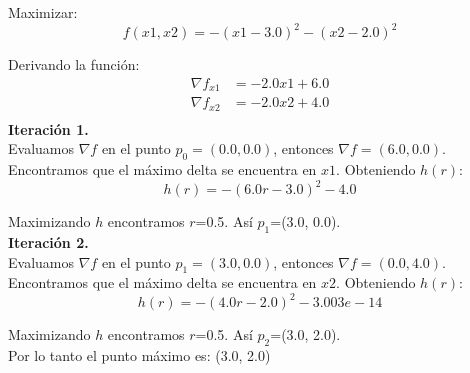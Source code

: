 \documentclass{article}
\title{}
\author{}
\date{}
\begin{document}
\decimalpoint
Maximizar:
$$f(x1, x2)=-(x1 - 3.0)^2 - (x2 - 2.0)^2$$

Derivando la función:
\begin{align*}
\nabla f_{x1} & = -2.0x1 + 6.0\\
\nabla f_{x2} & = -2.0x2 + 4.0\\
\end{align*}
\textbf{Iteración 1.}\\
Evaluamos $\nabla f$ en el punto $p_{0}=(0.0, 0.0)$, entonces $\nabla f =(6.0, 0.0)$. Encontramos que el máximo delta se encuentra en $x1$. Obteniendo $h(r)$:
$$h(r)=-(6.0r - 3.0)^2 - 4.0$$

Maximizando $h$ encontramos $r$=0.5.			Así $p_{1}$=(3.0, 0.0).$$$$
\textbf{Iteración 2.}\\
Evaluamos $\nabla f$ en el punto $p_{1}=(3.0, 0.0)$, entonces $\nabla f =(0.0, 4.0)$. Encontramos que el máximo delta se encuentra en $x2$. Obteniendo $h(r)$:
$$h(r)=-(4.0r - 2.0)^2 - 3.003e-14$$

Maximizando $h$ encontramos $r$=0.5.			Así $p_{2}$=(3.0, 2.0).$$$$
Por lo tanto el punto máximo es: (3.0, 2.0)
\end{document}
